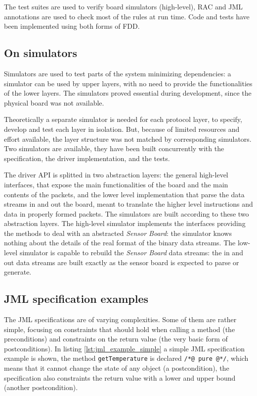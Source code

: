 \documentclass[english]{lni}
\newcommand{\lil}[1]{\texttt{\lstinline|#1|}}
\newcommand{\SB}{\emph{Sensor Board}\xspace}
\begin{document}
The test suites are used to verify board simulators (high-level), RAC and JML annotations are used to check most of the rules at run time.
Code and tests have been implemented using both forms of FDD.



\subsection{On simulators}
\label{subsec:on_simulators}

Simulators are used to test parts of the system minimizing dependencies: a simulator can be used by upper layers, with no need to provide the functionalities of the lower layers. 
The simulators proved essential during development, since the physical board was not available.

Theoretically a separate simulator is needed for each protocol layer, to specify, develop and test each layer in isolation.  
But, because of limited resources and effort available, the layer structure was not matched by corresponding simulators.
Two simulators are available, they have been built concurrently with the specification, the driver implementation, and the tests.

The driver API is splitted in two abstraction layers: the general high-level interfaces, that expose the main functionalities of the board and the main contents of the packets, and the lower level implementation that parse the data streams in and out the board, meant to translate the higher level instructions and data in properly formed packets.
The simulators are built according to these two abstraction layers.
The high-level simulator implements the interfaces providing the methods to deal with an abstracted \SB: the simulator knows nothing
about the details of the real format of the binary data streams.
The low-level simulator is capable to rebuild the \SB data streams: the in and out data streams are built exactly as the sensor board is expected to parse or generate.



\subsection{JML specification examples}
\label{subsec:a_jml_specification_example}

The JML specifications are of varying complexities.  
Some of them are rather simple, focusing on constraints that should hold when calling a method (the preconditions) and constraints on the return value (the very basic form of postconditions). 
In listing \ref{lst:jml_example_simple} a simple JML specification example is shown, the method \lil{getTemperature} is declared \lil{/*@ pure @*/}, which means that it cannot change the state of any object (a postcondition), the specification also constraints the return value with a lower and upper bound (another postcondition).
\end{document}
